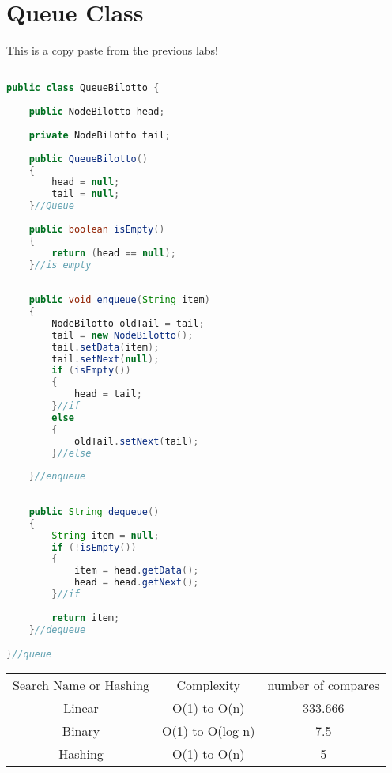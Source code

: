 \documentclass[letterpaper, 10pt]{article}
\begin{document}
\section{Queue Class}
This is a copy paste from the previous labs!
\begin{lstlisting}[language = java]

public class QueueBilotto {
	
	public NodeBilotto head;
	
	private NodeBilotto tail;
	
	public QueueBilotto()
	{
		head = null;
		tail = null;
	}//Queue
	
	public boolean isEmpty()
	{
		return (head == null);
	}//is empty
	
	
	public void enqueue(String item)
	{
		NodeBilotto oldTail = tail;
		tail = new NodeBilotto();
		tail.setData(item);
		tail.setNext(null);
		if (isEmpty())
		{
			head = tail;
		}//if
		else
		{
			oldTail.setNext(tail);
		}//else
		
	}//enqueue
	
	
	public String dequeue()
	{
		String item = null;
		if (!isEmpty())
		{
			item = head.getData();
			head = head.getNext();
		}//if
		
		return item;
	}//dequeue

}//queue


\end{lstlisting}

\begin{center}
\begin{tabular}{ |c|c|c| } 
 \hline
 Search Name or Hashing & Complexity & number of compares \\ 
 Linear & O(1) to O(n) & 333.666 \\ 
 Binary & O(1) to O(log n) & 7.5  \\ 
 Hashing & O(1) to O(n) & 5 \\ 
 \hline
\end{tabular}
\end{center}
\end{document}
